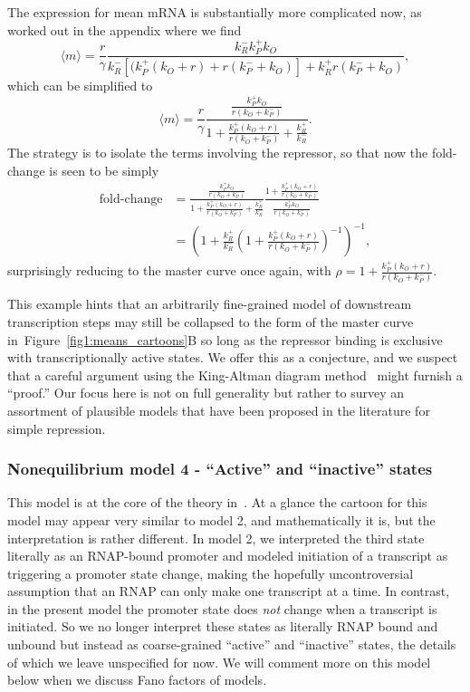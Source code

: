 \documentclass[12pt]{article}%
\newcommand{\fig}[1]{Figure~\ref{#1}}
\begin{document}
The expression for mean mRNA is substantially more complicated
now, as worked out in the appendix where we find
\begin{equation}
\langle m\rangle = \frac{r}{\gamma}
        \frac{k_R^- k_P^+ k_O}
        {k_R^- [(k_P^+ (k_O + r) + r(k_P^- + k_O)] + k_R^+ r(k_P^- + k_O)},
\end{equation}
which can be simplified to
\begin{equation}
\langle m\rangle
= \frac{r}{\gamma}
\frac{\frac{k_P^+ k_O}{r(k_O + k_P^-)}}
        {1 + \frac{k_P^+ (k_O + r)}{r(k_O + k_P^-)} + \frac{k_R^+}{k_R^-}}.
\end{equation}
The strategy is to isolate the terms involving the repressor, so that now the fold-change is seen to be simply
\begin{align}
\text{fold-change}
&= \frac{\frac{k_P^+ k_O}{r(k_O + k_P^-)}}
        {1 + \frac{k_P^+ (k_O + r)}{r(k_O + k_P^-)} + \frac{k_R^+}{k_R^-}}
        \frac{1 + \frac{k_P^+ (k_O + r)}{r(k_O + k_P^-)}}
                {\frac{k_P^+ k_O}{r(k_O + k_P^-)}}
\\
&= \left(
        1 + \frac{k_R^+}{k_R^-}
        \left(1 + \frac{k_P^+ (k_O + r)}{r(k_O + k_P^-)}\right)^{-1}
\right)^{-1},
\end{align}
surprisingly reducing to the master curve once again, with
$\rho = 1 + \frac{k_P^+ (k_O + r)}{r(k_O + k_P^-)}$.

This example hints that an arbitrarily fine-grained model of
downstream transcription steps may still be collapsed to the form
of the master curve in~\fig{fig1:means_cartoons}B so long as the
repressor binding is exclusive with transcriptionally active
states. We offer this as a conjecture, and we suspect that a
careful argument using the King-Altman diagram
method~\cite{King1956, Hill1966} might furnish a ``proof.''
Our focus here is not on full generality but rather to survey an
assortment of plausible models that have been proposed in the
literature for simple repression.

\subsubsection{Nonequilibrium model 4 - ``Active'' and ``inactive'' states}
This model is at the core of the theory in~\cite{Razo-Mejia2020}.
At a glance the cartoon for this model may appear very similar to model 2,
and mathematically it is, but the interpretation is rather different.
In model 2, we interpreted the third state literally as an
RNAP-bound promoter and modeled initiation of a transcript as
triggering a promoter state change, making the hopefully
uncontroversial assumption that an RNAP can only make one
transcript at a time. In contrast, in the present model the
promoter state does \textit{not} change when a transcript is
initiated. So we no longer interpret these states as literally
RNAP bound and unbound but instead as coarse-grained ``active''
and ``inactive'' states, the details of which we leave
unspecified for now. We will comment more on this model below
when we discuss Fano factors of models.
\end{document}
